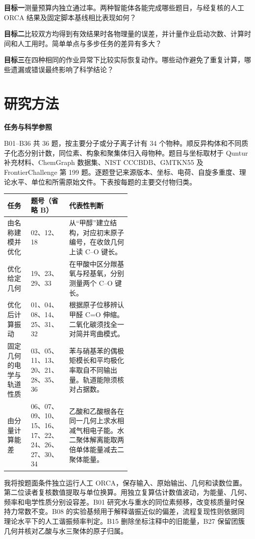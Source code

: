 \documentclass[12pt,a4paper]{article}
\newcommand{\subhead}[1]{\par\addvspace{0.38em}\textbf{#1}\par\nobreak}
\begin{document}
\textbf{目标一}\quad 测量预算内独立通过率。两种智能体各能完成哪些题目，与经复核的人工 ORCA 结果及固定脚本基线相比表现如何？

\textbf{目标二}\quad 比较双方均得到有效结果时各物理量的误差，并计量作业启动次数、计算时间和人工用时。简单单点与多步任务的差异有多大？

\textbf{目标三}\quad 在四种相同的作业异常下比较实际恢复动作。哪些动作避免了重复计算，哪些遗漏或错误最终影响了科学结论？

\clearpage
\section{研究方法}
\subhead{任务与科学参照}
B01--B36 共 36 题，按主要分子或分子离子计有 34 个物种。顺反异构体和不同质子化态分别计数，同位素、构象和聚集体归入母物种。题目与坐标取材于 Quntur 补充材料、ChemGraph 数据集、NIST CCCBDB、GMTKN55 及 FrontierChallenge 第 199 题\cite{quntur,chemgraph,nist,gmtkn,frontier}。逐题登记来源版本、坐标、电荷、自旋多重度、理论水平、单位和所需原始文件。下表按每题的主要交付物归类。

\begin{tabularx}{\linewidth}{@{}P{0.19\linewidth}P{0.31\linewidth}Y@{}}
\toprule
\textbf{任务} & \textbf{题号（省略 B）} & \textbf{代表性判断} \\
\midrule
由名称建模并优化 & 02、12、18 & 从“甲醇”建立结构，对应初末原子编号，在收敛几何上读 C--O 键长。\\
优化给定几何 & 19、23、29、33 & 在甲酸中区分羰基氧与羟基氧，分别测量两个 C--O 键长。\\
优化后计算振动 & 01、04、08、14、25、31、32 & 根据原子位移辨认甲醛 C=O 伸缩。二氧化碳须找全一对简并弯曲模式。\\
固定几何的电学与轨道性质 & 03、05、11、13、20、21、28、35、36 & 苯与硝基苯的偶极矩模长和平均极化率取自不同输出量。轨道能隙须核对占据数。\\
由分量计算能差 & 06、07、09、10、15、16、17、22、24、26、27、30、34 & 乙酸和乙酸根各在同一几何上求水相减气相电子能。水二聚体解离能取两倍单体能量减去二聚体能量。\\
\bottomrule
\end{tabularx}

我将按题面条件独立运行人工 ORCA，保存输入、原始输出、几何和读数位置。第二位读者复核数值提取与单位换算。用独立复算估计数值波动，为能量、几何、频率和电学性质分别设容差。B01 研究水与重水的同位素频移，改变核质量时保持力常数不变。B08 的实验基频用于解释谐振近似的偏差，流程复现性则依据同理论水平下的人工谐振频率判定。B15 删除坐标注释中的旧能量，B27 保留团簇几何并核对乙酸与水三聚体的原子归属。
\end{document}

